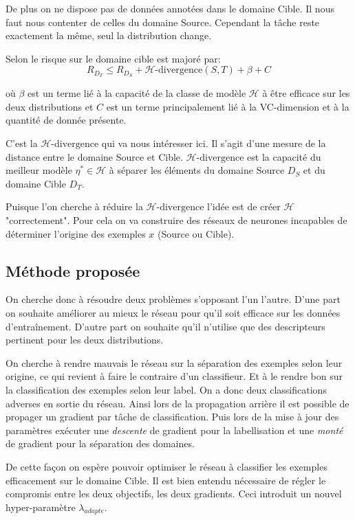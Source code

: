 \documentclass[accepted]{article} %
\begin{document}
De plus on ne dispose pas de données annotées
dans le domaine Cible. Il nous faut nous contenter de celles du domaine Source.
Cependant la tâche reste exactement la même, seul la distribution change.

Selon \cite{BenDavid} le risque sur le domaine cible est majoré par:
$$ R_{D_T} \le R_{D_S} + \mathcal{H}\text{-divergence}(S,T) + \beta + C $$

où $\beta$ est un terme lié à la capacité de la classe de modèle $\mathcal{H}$
à être efficace sur les deux distributions et $C$ est un terme principalement
lié à la VC-dimension et à la quantité de donnée présente.

C'est la $\mathcal{H}\text{-divergence}$ qui va nous intéresser ici.
Il s'agit d'une mesure de la distance entre le domaine Source et Cible.
$\mathcal{H}\text{-divergence}$ est la capacité du meilleur modèle 
$\eta^*\in\mathcal{H}$ à séparer les éléments du domaine Source $D_S$ et du
domaine Cible $D_T$.

Puisque l'on cherche à réduire la $\mathcal{H}\text{-divergence}$ l'idée est 
de créer $\mathcal{H}$ "correctement".
Pour cela on va construire des réseaux de neurones incapables de déterminer
l'origine des exemples $x$ (Source ou Cible).

\subsection{Méthode proposée} %
\label{sub:methode}

On cherche donc à résoudre deux problèmes s'opposant l'un l'autre. D'une part
on souhaite améliorer au mieux le réseau pour qu'il soit efficace sur les
données d'entraînement. D'autre part on souhaite qu'il n'utilise que des 
descripteurs pertinent pour les deux distributions.

On cherche à rendre mauvais le réseau sur la séparation des exemples
selon leur origine, ce qui revient à faire le contraire d'un classifieur. Et
à le rendre bon sur la classification des exemples selon leur label.
On a donc deux classifications adverses en sortie du réseau.
Ainsi lors de la propagation arrière il est possible de propager un gradient
par tâche de classification. Puis lors de la mise à jour des paramètres 
exécuter une \emph{descente} de gradient pour la labellisation et une 
\emph{monté} de gradient pour la séparation des domaines.

De cette façon on espère pouvoir optimiser le réseau à classifier les exemples
efficacement sur le domaine Cible. Il est bien entendu nécessaire de régler
le compromis entre les deux objectifs, les deux gradients. Ceci introduit
un nouvel hyper-paramètre $\lambda_{adapte}$.
\end{document}

